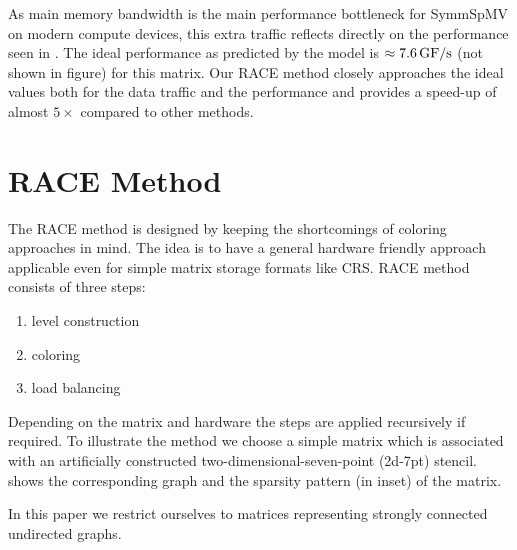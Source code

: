 As main memory bandwidth is the main performance bottleneck for \acrshort{SymmSpMV} on modern compute devices,
 this extra traffic reflects directly on the performance 
 seen in . The ideal 
 performance as predicted by the model is $\approx 7.6\,\mbox{GF/s}$ (not shown in figure)
 for this matrix. 
Our \acrshort{RACE} method closely approaches the ideal values both for the data traffic and the  performance  and provides a speed-up of almost
  $5\times$ compared to other methods.

\section{RACE Method} \label{sec:RACE_method}
The \acrshort{RACE} method is designed by  keeping the shortcomings
of coloring approaches in mind. The idea is to have a general hardware 
friendly approach applicable even for simple matrix storage formats 
like \acrshort{CRS}.
\Acrshort{RACE} method consists of three steps:
\begin{enumerate}
	\item level construction
	\item \DK coloring
	\item load balancing
\end{enumerate}
Depending on the matrix and hardware the steps are applied recursively 
if required. 
To illustrate the method we choose a
simple matrix which is associated with an artificially constructed
two-dimensional-seven-point (2d-7pt) stencil.  shows
the corresponding graph and the sparsity pattern (in inset) of the matrix.

In this paper we restrict ourselves to matrices representing strongly connected 
undirected graphs.

